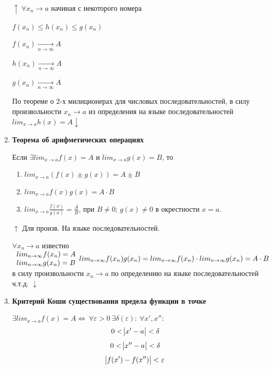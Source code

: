 \documentclass{article}
\begin{document}
\begin{enumerate}
    \(\uparrow\ \forall x_n \rightarrow a\) начиная с некоторого номера
    
    \( f(x_n) \leq h(x_n) \leq g(x_n) \)

    \( f(x_n) \xrightarrow[n \rightarrow \infty]{} A \)

    \( h(x_n) \xrightarrow[n \rightarrow \infty]{} A \)

    \( g(x_n) \xrightarrow[n \rightarrow \infty]{} A \)

    По теореме о 2-х милиционерах для числовых последовательностей, в силу произвольности \(x_n \rightarrow a\) из определения на языке последовательностей \(lim_{x \rightarrow a} h(x) = A \downarrow\)
    
    \item \textbf{Теорема об арифметических операциях}

      Если \(\exists lim_{x \rightarrow a} f(x)=A\) и \(lim_{x\rightarrow a} g(x) = B\), то
      \begin{enumerate}
        \item \(lim_{x \rightarrow a}(f(x)\pm g(x))=A\pm B\)
        \item \(lim_{x \rightarrow a} f(x)g(x) = A \cdot B\)
        \item \(lim_{x \rightarrow a} \frac{f(x)}{g(x)} = \frac{A}{B}\), при \(B \neq 0\); \(g(x) \neq 0\) в окрестности \(x=a\).
      \end{enumerate}

      \(\uparrow\) Для произв. На языке последовательностей.

      \(\forall x_n \rightarrow a\) известно \(\begin{array}{l} lim_{n \rightarrow \infty} f(x_n) = A\\ lim_{n \rightarrow \infty} g(x_n) = B\end{array}\\ 
      lim_{n \rightarrow \infty} f(x_n)g(x_n)=lim_{n \rightarrow \infty} f(x_n) \cdot lim_{n \rightarrow \infty} g(x_n)=A \cdot B\)\\
      в силу произвольности \(x_n \rightarrow a\) по определению на языке последовательностей ч.т.д. \(\downarrow\)
  
      \item \textbf{Критерий Коши существования предела функции в точке}
      
      \( \exists lim_{x \rightarrow a} f(x) = A \Leftrightarrow\ \forall \varepsilon > 0\ \exists \delta(\varepsilon):\ \forall x',x'': \)
      \[ 0 < \abs{x' - a} < \delta \]
      \[ 0 < \abs{x'' - a} < \delta \]
      \[ \abs{f(x') - f(x'')} < \varepsilon \]
      

\end{enumerate}
\end{document}
